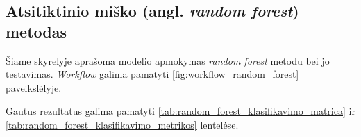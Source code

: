 \subsection{Atsitiktinio miško (angl. \textit{random forest}) metodas}
\label{subsec:decision_tree}

Šiame skyrelyje aprašoma modelio apmokymas \textit{random forest} metodu bei jo testavimas. \textit{Workflow} galima pamatyti \ref{fig:workflow_random_forest} paveikslėlyje.



Gautus rezultatus galima pamatyti \ref{tab:random_forest_klasifikavimo_matrica} ir \ref{tab:random_forest_klasifikavimo_metrikos} lentelėse.


